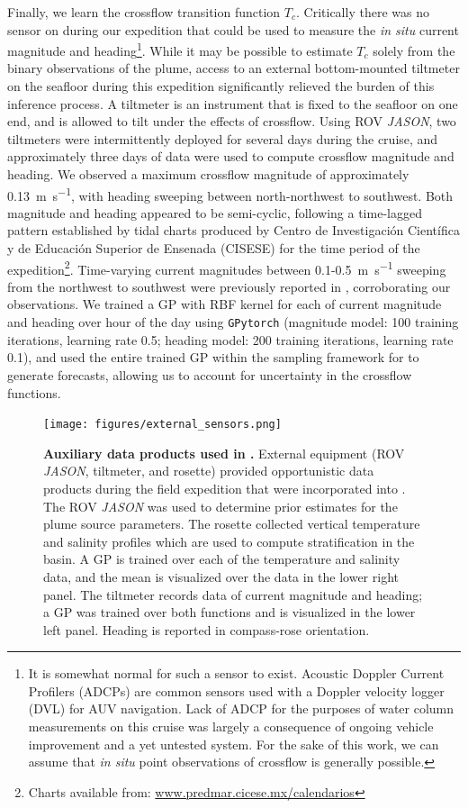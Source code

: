 Finally, we learn the crossflow transition function $T_c$. Critically there was no sensor on \Sentry during our expedition that could be used to measure the \emph{in situ} current magnitude and heading\footnote{It is somewhat normal for such a sensor to exist. Acoustic Doppler Current Profilers (ADCPs) are common sensors used with a Doppler velocity logger (DVL) for AUV navigation. Lack of ADCP for the purposes of water column measurements on this cruise was largely a consequence of ongoing vehicle improvement and a yet untested system. For the sake of this work, we can assume that \emph{in situ} point observations of crossflow is generally possible.}. While it may be possible to estimate $T_c$ solely from the binary observations of the plume, access to an external bottom-mounted tiltmeter on the seafloor during this expedition significantly relieved the burden of this inference process. A tiltmeter is an instrument that is fixed to the seafloor on one end, and is allowed to tilt under the effects of crossflow. Using ROV \emph{JASON}, two tiltmeters were intermittently deployed for several days during the cruise, and approximately three days of data were used to compute crossflow magnitude and heading. We observed a maximum crossflow magnitude of approximately \SI{0.13}{\meter\per\second}, with heading sweeping between north-northwest to southwest. Both magnitude and heading appeared to be semi-cyclic, following a time-lagged pattern established by tidal charts produced by Centro de Investigaci\'on Cient\'ifica y de Educaci\'on Superior de Ensenada (CISESE) for the time period of the expedition\footnote{Charts available from: \url{www.predmar.cicese.mx/calendarios}}. Time-varying current magnitudes between 0.1-\SI{0.5}{\meter\per\second} sweeping from the northwest to southwest were previously reported in \autocite{scholz2019shelf}, corroborating our observations. We trained a GP with RBF kernel for each of current magnitude and heading over hour of the day using \verb|GPytorch| (magnitude model: 100 training iterations, learning rate 0.5; heading model: 200 training iterations, learning rate 0.1), and used the entire trained GP within the sampling framework for \PHUMES to generate forecasts, allowing us to account for uncertainty in the crossflow functions. 

\begin{figure}[h!]
    \centering
    \texttt{[image: figures/external\_sensors.png]}
    \caption[Auxiliary data products used in \PHUMES.]{\textbf{Auxiliary data products used in \PHUMES.} External equipment (ROV \emph{JASON}, tiltmeter, and rosette) provided opportunistic data products during the field expedition that were incorporated into \PHUMES. The ROV \emph{JASON} was used to determine prior estimates for the plume source parameters. The rosette collected vertical temperature and salinity profiles which are used to compute stratification in the basin. A GP is trained over each of the temperature and salinity data, and the mean is visualized over the data in the lower right panel. The tiltmeter records data of current magnitude and heading; a GP was trained over both functions and is visualized in the lower left panel. Heading is reported in compass-rose orientation.}
    \label{fig:ext_sensors}
\end{figure}


